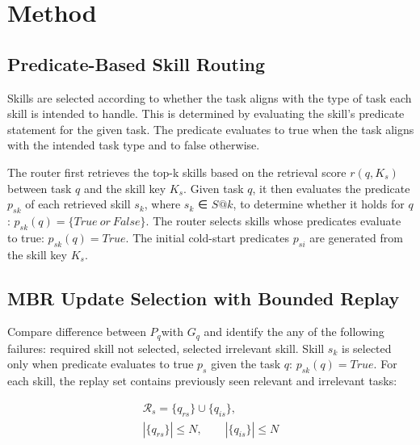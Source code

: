 
\section{Method}

\subsection{Predicate-Based Skill Routing}

Skills are selected according to whether the task aligns with the type of task each skill is intended to handle. This is determined by evaluating the skill's predicate statement for the given task. The predicate evaluates to true when the task aligns with the intended task type and to false otherwise.

The router first retrieves the top-k skills based on the retrieval score \(r(q,K_{s})\) between task \(q\) and the skill key \(K_{s}\). Given task \(q\), it then evaluates the predicate \(p_{sk}\) of each retrieved skill \(s_{k}\), where \(s_{k}\) ∈ \(S@k\), to determine whether it holds for \(q\): \(p_{sk}(q) = \{ True\ or\ False\}\). The router selects skills whose predicates evaluate to true: \(p_{sk}(q) = True\). The initial cold-start predicates \(p_{si}\) are generated from the skill key \(K_{s}\).

\subsection{MBR Update Selection with Bounded Replay}

Compare difference between \(P_{q}\)with \(G_{q}\) and identify the any of the following failures: required skill not selected, selected irrelevant skill. Skill \(s_{k}\) is selected only when predicate evaluates to true \(p_{s}\) given the task \(q\): \(p_{sk}(q) = True\). For each skill, the replay set contains previously seen relevant and irrelevant tasks:

\[\begin{gathered}\mathcal{R}_s = \{q_{rs}\}\cup\{q_{is}\},\\ |\{q_{rs}\}|\leq N,\qquad |\{q_{is}\}|\leq N\end{gathered}\]

